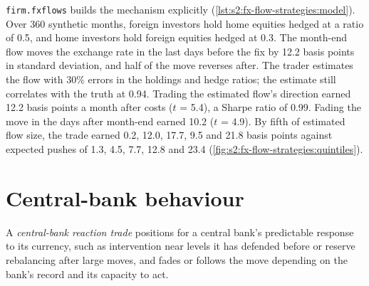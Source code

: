 \texttt{firm.fxflows} builds the mechanism explicitly (\cref{lst:s2:fx-flow-strategies:model}). Over 360 synthetic months, foreign investors hold home
equities hedged at a ratio of 0.5, and home investors hold foreign equities hedged at 0.3. The month-end flow moves the exchange rate in the last days
before the fix by 12.2 basis points in standard deviation, and half of the move reverses after. The trader estimates the flow with 30\% errors in the
holdings and hedge ratios; the estimate still correlates with the truth at 0.94. Trading the estimated flow's direction earned 12.2 basis points a
month after costs ($t$ = 5.4), a Sharpe ratio of 0.99. Fading the move in the days after month-end earned 10.2 ($t$ = 4.9). By fifth of estimated flow
size, the trade earned 0.2, 12.0, 17.7, 9.5 and 21.8 basis points against expected pushes of 1.3, 4.5, 7.7, 12.8 and 23.4
(\cref{fig:s2:fx-flow-strategies:quintiles}).

\begin{omfigure}

\label{fig:s2:fx-flow-strategies:quintiles}
\end{omfigure}

\section{Central-bank behaviour}

\begin{definition}\label{def:s2:fx-flow-strategies:cb}
A \emph{central-bank reaction trade} positions for a central bank's predictable response to its currency, such as
intervention near levels it has defended before or reserve rebalancing after large moves, and fades or follows the move depending on the bank's
record and its capacity to act.
\end{definition}

